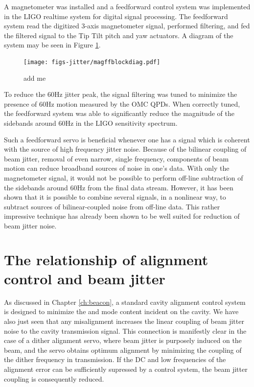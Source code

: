 A magnetometer was installed and a feedforward control system was implemented in the LIGO realtime system for digital signal processing. %
The feedforward system read the digitized 3-axis magnetometer signal, performed filtering, and fed the filtered signal to the Tip Tilt pitch and yaw actuators. %
A diagram of the system may be seen in Figure \ref{fig:magffblockdiag}. %


\begin{figure}
  \begin{center}
  \leavevmode
  \texttt{[image: figs-jitter/magffblockdiag.pdf]}
  \end{center}
  \caption[add me]{add me}
  \label{fig:magffblockdiag}
\end{figure}

To reduce the 60Hz jitter peak, the signal filtering was tuned to minimize the presence of 60Hz motion measured by the OMC QPDs. %
When correctly tuned, the feedforward system was able to significantly reduce the magnitude of the sidebands around 60Hz in the LIGO sensitivity spectrum. %

Such a feedforward servo is beneficial whenever one has a signal which is coherent with the source of high frequency jitter noise. %
Because of the bilinear coupling of beam jitter, removal of even narrow, single frequency, components of beam motion can reduce broadband sources of noise in one's data. %
With only the magnetometer signal, it would not be possible to perform off-line subtraction of the sidebands around 60Hz from the final data stream. %
However, it has been shown  that it is possible to combine several signals, in a nonlinear way, to subtract sources of bilinear-coupled noise from off-line data. This rather impressive technique has already been shown to be well suited for reduction of beam jitter noise.

\section{The relationship of alignment control and beam jitter}
As discussed in Chapter \ref{ch:beacon}, a standard cavity alignment control system is designed to minimize the  and  mode content incident on the cavity. %
We have also just seen that any misalignment increases the linear coupling of beam jitter noise to the cavity transmission signal. %
This connection is manifestly clear in the case of a dither alignment servo, where beam jitter is purposely induced on the beam, and the servo obtains optimum alignment by minimizing the coupling of the dither frequency in transmission. %
If the DC and low frequencies of the alignment error can be sufficiently supressed by a control system, the beam jitter coupling is consequently reduced.

